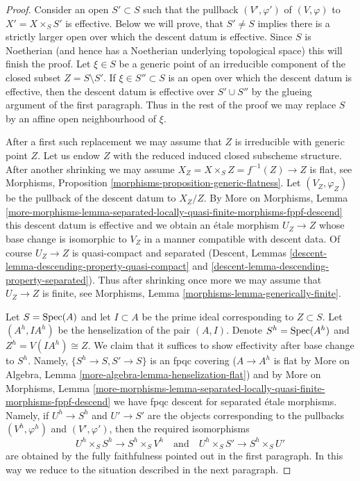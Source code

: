 \begin{proof}
\medskip\noindent
Consider an open $S' \subset S$ such that the pullback $(V', \varphi')$
of $(V, \varphi)$ to $X' = X \times_S S'$ is effective. Below we will
prove, that $S' \not = S$ implies there is a strictly larger open over
which the descent datum is effective. Since $S$ is Noetherian (and hence
has a Noetherian underlying topological space) this will finish the proof.
Let $\xi \in S$ be a generic point of an irreducible component of the
closed subset $Z = S \setminus S'$.
If $\xi \in S'' \subset S$ is an open over which the descent datum is
effective, then the descent datum is effective over
$S' \cup S''$ by the glueing argument of the first paragraph. Thus
in the rest of the proof we may replace $S$ by an affine open
neighbourhood of $\xi$.

\medskip\noindent
After a first such replacement we may assume that $Z$ is irreducible
with generic point $Z$. Let us endow $Z$ with the reduced induced
closed subscheme structure. After another shrinking we may assume
$X_Z = X \times_S Z = f^{-1}(Z) \to Z$ is flat, see
Morphisms, Proposition \ref{morphisms-proposition-generic-flatness}.
Let $(V_Z, \varphi_Z)$ be the pullback of the descent datum to $X_Z/Z$.
By More on Morphisms, Lemma
\ref{more-morphisms-lemma-separated-locally-quasi-finite-morphisms-fppf-descend}
this descent datum is effective and we obtain an \'etale morphism
$U_Z \to Z$ whose base change is isomorphic to $V_Z$ in a manner
compatible with descent data.
Of course $U_Z \to Z$ is quasi-compact and separated
(Descent, Lemmas \ref{descent-lemma-descending-property-quasi-compact} and
\ref{descent-lemma-descending-property-separated}).
Thus after shrinking once more we may assume
that $U_Z \to Z$ is finite, see
Morphisms, Lemma \ref{morphisms-lemma-generically-finite}.

\medskip\noindent
Let $S = \mathop{\mathrm{Spec}}(A)$ and let $I \subset A$ be the prime ideal corresponding
to $Z \subset S$. Let $(A^h, IA^h)$ be the henselization of the pair
$(A, I)$. Denote $S^h = \mathop{\mathrm{Spec}}(A^h)$ and $Z^h = V(IA^h) \cong Z$.
We claim that it suffices to show effectivity after base change to
$S^h$. Namely, $\{S^h \to S, S' \to S\}$ is an fpqc covering
($A \to A^h$ is flat by More on Algebra, Lemma
\ref{more-algebra-lemma-henselization-flat}) and
by More on Morphisms, Lemma
\ref{more-morphisms-lemma-separated-locally-quasi-finite-morphisms-fppf-descend}
we have fpqc descent for separated \'etale morphisms.
Namely, if $U^h \to S^h$ and $U' \to S'$ are the objects
corresponding to the pullbacks $(V^h, \varphi^h)$ and
$(V', \varphi')$, then the required isomorphisms
$$
U^h \times_S S^h \to S^h \times_S V^h
\quad\text{and}\quad
U^h \times_S S' \to S^h \times_S U'
$$
are obtained by the fully faithfulness pointed out in the first
paragraph. In this way we reduce to the situation described in
the next paragraph.


\end{proof}
